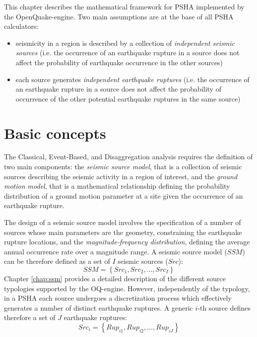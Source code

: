 This chapter describes the mathematical framework for PSHA implemented by the OpenQuake-engine.
Two main assumptions are at the base of all PSHA calculators:
\begin{itemize}
	\item seismicity in a region is described by a collection of \textit{independent seismic sources}
	(i.e. the occurrence of an earthquake rupture in a source does not affect the probability of
	earthquake occurrence in the other sources)
	\item each source generates \textit{independent earthquake ruptures} (i.e. the occurrence of an
	earthquake rupture in a source does not affect the probability of occurrence of the other
	potential earthquake ruptures in the same source)
\end{itemize}

\section{Basic concepts}
The Classical, Event-Based, and Disaggregation analysis requires the definition of two main components:
the \textit{seismic source model}, that is a collection of seismic sources describing the seismic activity in a
region of interest, and the \textit{ground motion model}, that is a mathematical relationship defining the
probability distribution of a ground motion parameter at a site given the occurrence of an earthquake
rupture.

The design of a seismic source model involves the specification of a number of sources whose main parameters
are the geometry, constraining the earthquake rupture locations, and the \textit{magnitude-frequency
distribution}, defining the average annual occurrence rate over a magnitude range. A seismic source model ($SSM$)
can be therefore defined as a set of $I$ seismic sources ($Src$):
\begin{equation}
SSM = \left\{Src_{1}, Src_{2}, ..., Src_{I}\right\}
\end{equation}
Chapter \ref{chap:ssm} provides
a detailed description of the different source typologies supported by the OQ-engine. However, independently
of the typology, in a PSHA each source undergoes a discretization process which effectively generates a
number of distinct earthquake ruptures. A generic $i$-th source defines therefore a set of $J$ earthquake ruptures:
\begin{equation}
Src_{i} = \left\{Rup_{i1}, Rup_{i2}, ..., Rup_{iJ}\right\}
\end{equation}

